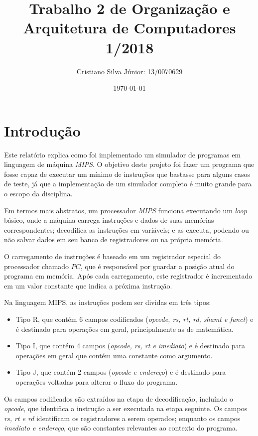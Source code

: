 \documentclass[12pt, a4paper, twoside]{article}
\begin{document}
\title{Trabalho 2 de Organização e Arquitetura de Computadores 1/2018}
\author{Cristiano Silva Júnior: 13/0070629}
\date{\today}
\maketitle

\section{Introdução}

Este relatório explica como foi implementado um simulador de programas em
linguagem de máquina \textit{MIPS}. O objetivo deste projeto foi fazer um
programa que fosse capaz de executar um mínimo de instruções que bastasse
para alguns casos de teste, já que a implementação de um simulador completo é
muito grande para o escopo da disciplina.

Em termos mais abstratos, um processador \textit{MIPS} funciona executando um
\textit{loop} básico, onde a máquina carrega instruções e dados de suas
memórias correspondentes; decodifica as instruções em variáveis; e as executa,
podendo ou não salvar dados em seu banco de registradores ou na própria
memória.

O carregamento de instruções é baseado em um registrador especial do
processador chamado $PC$, que é responsável por guardar a posição atual do
programa em memória. Após cada carregamento, este registrador é incrementado
em um valor constante que indica a próxima instrução.

Na linguagem MIPS, as instruções podem ser dividas em três tipos:

\begin{itemize}
    \item Tipo R, que contém 6 campos codificados (\textit{opcode, rs, rt,
    rd, shamt e funct}) e é destinado para operações em geral, principalmente
    as de matemática.
    \item Tipo I, que contém 4 campos (\textit{opcode, rs, rt e imediato}) e
    é destinado para operações em geral que contém uma constante como
    argumento.
    \item Tipo J, que contém 2 campos (\textit{opcode e endereço}) e é
    destinado para operações voltadas para alterar o fluxo do programa.
\end{itemize}

Os campos codificados são extraídos na etapa de decodificação, incluíndo o
\textit{opcode}, que identifica a instrução a ser executada na etapa seguinte.
Os campos \textit{rs, rt e rd} identificam os registradores a serem operados;
enquanto os campos \textit{imediato e endereço}, que são constantes relevantes
ao contexto do programa.
\end{document}
